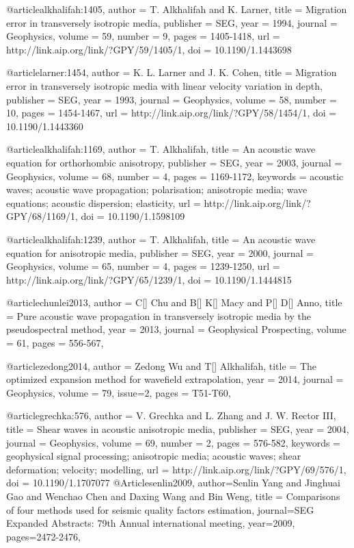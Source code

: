 {@article{alkhalifah:1405,
  author =	 {T. Alkhalifah and K. Larner},
  title =	 {Migration error in transversely isotropic media},
  publisher =	 {SEG},
  year =	 1994,
  journal =	 {Geophysics},
  volume =	 59,
  number =	 9,
  pages =	 {1405-1418},
  url =		 {http://link.aip.org/link/?GPY/59/1405/1},
  doi =		 {10.1190/1.1443698}
}

@article{larner:1454,
  author =	 {K. L. Larner and J. K. Cohen},
  title =	 {Migration error in transversely isotropic media with
                  linear velocity variation in depth},
  publisher =	 {SEG},
  year =	 1993,
  journal =	 {Geophysics},
  volume =	 58,
  number =	 10,
  pages =	 {1454-1467},
  url =		 {http://link.aip.org/link/?GPY/58/1454/1},
  doi =		 {10.1190/1.1443360}
}

@article{alkhalifah:1169,
  author =	 {T. Alkhalifah},
  title =	 {An acoustic wave equation for orthorhombic
                  anisotropy},
  publisher =	 {SEG},
  year =	 2003,
  journal =	 {Geophysics},
  volume =	 68,
  number =	 4,
  pages =	 {1169-1172},
  keywords =	 {acoustic waves; acoustic wave propagation;
                  polarisation; anisotropic media; wave equations;
                  acoustic dispersion; elasticity},
  url =		 {http://link.aip.org/link/?GPY/68/1169/1},
  doi =		 {10.1190/1.1598109}
}

@article{alkhalifah:1239,
  author =	 {T. Alkhalifah},
  title =	 {An acoustic wave equation for anisotropic media},
  publisher =	 {SEG},
  year =	 2000,
  journal =	 {Geophysics},
  volume =	 65,
  number =	 4,
  pages =	 {1239-1250},
  url =		 {http://link.aip.org/link/?GPY/65/1239/1},
  doi =		 {10.1190/1.1444815}
}

@article{chunlei2013,
  author =	 {C[] Chu and B[] K[] Macy and P[] D[] Anno},
  title =	 { Pure acoustic wave propagation in transversely isotropic media by the pseudospectral method},
  year =	 2013,
  journal =	 {Geophysical Prospecting},
  volume =	 61,
  pages =	 {556-567},
}

@article{zedong2014,
  author =	 {Zedong Wu and T[] Alkhalifah},
  title =	 {The optimized expansion method for wavefield extrapolation},
  year =	 2014,
  journal =	 {Geophysics},
  volume =	 79,
  issue=2,
  pages =	 {T51-T60},
}

@article{grechka:576,
  author =	 {V. Grechka and L. Zhang and J.
                  W. Rector III},
  title =	 {Shear waves in acoustic anisotropic media},
  publisher =	 {SEG},
  year =	 2004,
  journal =	 {Geophysics},
  volume =	 69,
  number =	 2,
  pages =	 {576-582},
  keywords =	 {geophysical signal processing; anisotropic media;
                  acoustic waves; shear deformation; velocity;
                  modelling},
  url =		 {http://link.aip.org/link/?GPY/69/576/1},
  doi =		 {10.1190/1.1707077}
}
@Article{senlin2009,
  author={Senlin Yang and Jinghuai Gao and Wenchao Chen and Daxing Wang and Bin Weng},
  title = {Comparisons of four methods used for seismic quality factors estimation},
  journal={SEG Expanded Abstracts: 79th Annual international meeting},
  year=2009,
  pages={2472-2476},
}

}
